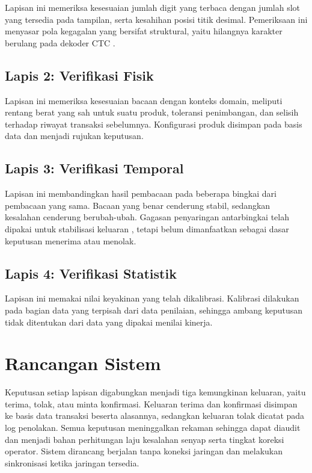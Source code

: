 Lapisan ini memeriksa kesesuaian jumlah digit yang terbaca dengan jumlah slot
yang tersedia pada tampilan, serta kesahihan posisi titik desimal. Pemeriksaan
ini menyasar pola kegagalan yang bersifat struktural, yaitu hilangnya karakter
berulang pada dekoder CTC \parencite{graves2006ctc,oicws2026lcd}.

\subsection{Lapis 2: Verifikasi Fisik}

Lapisan ini memeriksa kesesuaian bacaan dengan konteks domain, meliputi rentang
berat yang sah untuk suatu produk, toleransi penimbangan, dan selisih terhadap
riwayat transaksi sebelumnya. Konfigurasi produk disimpan pada basis data dan
menjadi rujukan keputusan.

\subsection{Lapis 3: Verifikasi Temporal}

Lapisan ini membandingkan hasil pembacaan pada beberapa bingkai dari pembacaan
yang sama. Bacaan yang benar cenderung stabil, sedangkan kesalahan cenderung
berubah-ubah. Gagasan penyaringan antarbingkai telah dipakai untuk stabilisasi
keluaran \parencite{yenneti2023lightweight}, tetapi belum dimanfaatkan sebagai
dasar keputusan menerima atau menolak.

\subsection{Lapis 4: Verifikasi Statistik}

Lapisan ini memakai nilai keyakinan yang telah dikalibrasi. Kalibrasi dilakukan
pada bagian data yang terpisah dari data penilaian, sehingga ambang keputusan
tidak ditentukan dari data yang dipakai menilai kinerja.

\section{Rancangan Sistem}

Keputusan setiap lapisan digabungkan menjadi tiga kemungkinan keluaran, yaitu
terima, tolak, atau minta konfirmasi. Keluaran terima dan konfirmasi disimpan ke
basis data transaksi beserta alasannya, sedangkan keluaran tolak dicatat pada log
penolakan. Semua keputusan meninggalkan rekaman sehingga dapat diaudit dan
menjadi bahan perhitungan laju kesalahan senyap serta tingkat koreksi operator.
Sistem dirancang berjalan tanpa koneksi jaringan dan melakukan sinkronisasi
ketika jaringan tersedia.

